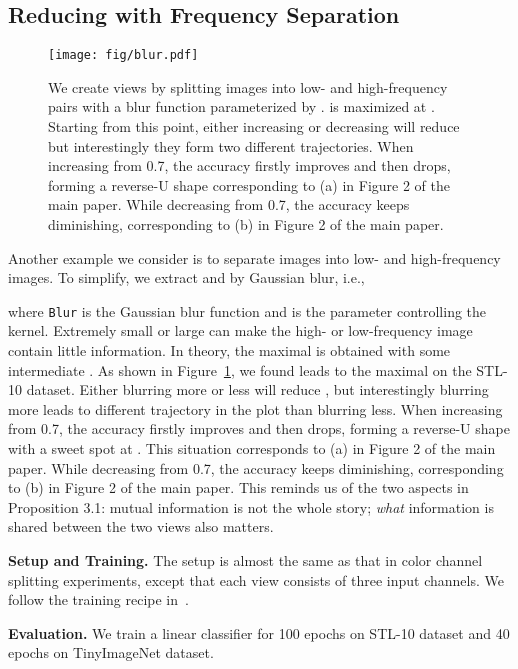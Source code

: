\documentclass{article}
\begin{document}
\subsection{Reducing  with Frequency Separation}
\begin{figure}[ht]
\centering
\texttt{[image: fig/blur.pdf]}
\vspace{-5pt}
\caption{\small We create views by splitting images into low- and high-frequency pairs with a blur function parameterized by .  is maximized at . Starting from this point, either increasing or decreasing  will reduce  but interestingly they form two different trajectories. When increasing  from 0.7, the accuracy firstly improves and then drops, forming a reverse-U shape corresponding to (a) in Figure 2 of the main paper. While decreasing  from 0.7, the accuracy keeps diminishing, corresponding to (b) in Figure 2 of the main paper.}
\label{fig:blur}
\end{figure}
 
Another example we consider is to separate images into low- and high-frequency images. To simplify, we extract  and  by Gaussian blur, i.e., 

where \texttt{Blur} is the Gaussian blur function and  is the parameter controlling the kernel. Extremely small or large  can make the high- or low-frequency image contain little information. In theory, the maximal  is obtained with some intermediate . As shown in Figure~\ref{fig:blur}, we found  leads to the maximal  on the STL-10 dataset. Either blurring more or less will reduce , but interestingly blurring more leads to different trajectory in the plot than blurring less. When increasing  from 0.7, the accuracy firstly improves and then drops, forming a reverse-U shape with a sweet spot at . This situation corresponds to (a) in Figure 2 of the main paper. While decreasing  from 0.7, the accuracy keeps diminishing, corresponding to (b) in Figure 2 of the main paper. This reminds us of the two aspects in Proposition 3.1: mutual information is not the whole story; \emph{what} information is shared between the two views also matters.

\textbf{Setup and Training.} The setup is almost the same as that in color channel splitting experiments, except that each view consists of three input channels. We follow the training recipe in~\cite{tian2019contrastive}.

\noindent\textbf{Evaluation.} We train a linear classifier for 100 epochs on STL-10 dataset and 40 epochs on TinyImageNet dataset.
\end{document}
